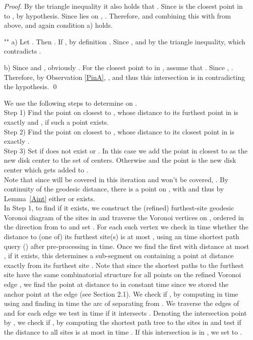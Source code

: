\documentclass{llncs}
\begin{document}
\begin{proof}
By the triangle inequality it also holds that . Since  is the closest point in  to ,  by hypothesis. Since  lies on , . Therefore,   and combining this with  from above,  and again condition a) holds.

\noindent ""
\noindent a) Let .  Then .  If , by definition . Since ,  and by the triangle inequality,  which contradicts .

\noindent b) Since  and , obviously .  For  the closest point to  in , assume that .  Since , .  Therefore, by Observation \ref{PinA}, , and thus this intersection is in  contradicting the hypothesis.
\qed
\end{proof}






We use the following steps to determine  on .\\
Step 1)  Find the point  on  closest to , whose distance to its furthest point  in  is exactly  and , if such a point  exists. \\
Step 2) Find the point  on  closest to , whose distance to its closest point in  is exactly .  \\
Step 3) Set  if  does not exist or . In this case we add the point in  closest to  as the new disk center to the set  of centers. Otherwise  and the point  is the new disk center which gets added to .\\ 



Note that since  will be covered in this iteration and  won't be covered, . By continuity of the geodesic distance, there is a point  on , with  and thus by Lemma~\ref{Aint} either  or  exists.\\

In Step 1, to find  if it exists, we construct the (refined) furthest-site geodesic Voronoi diagram of the sites  in  and traverse the Voronoi vertices  on , ordered in the direction from   to  and set . For each such vertex we check in  time whether the distance to (one of) its furthest site(s) is at most , using an  time shortest path query (\cite{Guibas1989126}) after pre-processing  in  time. Once we find the first  with distance at most , if it exists, this determines a sub-segment  on  containing a point  at distance exactly  from its furthest site . Note that since the shortest paths to the furthest site  have the same combinatorial structure for all points on the refined Voronoi edge , we find the point at distance  to  in constant time since we stored the anchor point  at the edge  (see Section 2.1). We check if , by computing  in time  using \cite{lineshortpath} and finding in  time the arc  of  separating  from . We traverse the edges of  and for each edge we test in  time if it intersects . Denoting the intersection point by , we check if , by computing the shortest path tree to the sites in  and test if the distance to all sites is at most  in time . If this intersection is in , we set  to .\\
\end{document}
